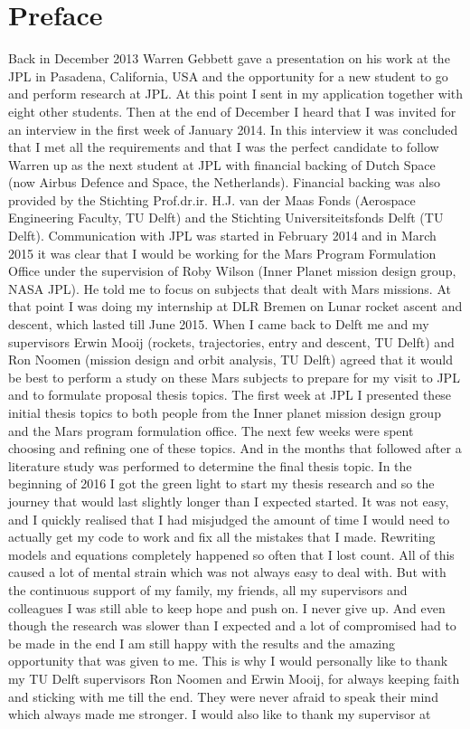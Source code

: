 \chapter*{Preface} 

Back in December 2013 Warren Gebbett gave a presentation on his work at the \ac{JPL} in Pasadena, California, USA and the opportunity for a new student to go and perform research at \ac{JPL}. At this point I sent in my application together with eight other students.  Then at the end of December I heard that I was invited for an interview in the first week of January 2014. In this interview it was concluded that I met all the requirements and that I was the perfect candidate to follow Warren up as the next student at \ac{JPL} with financial backing of Dutch Space (now Airbus Defence and Space, the Netherlands). Financial backing was also provided by the Stichting Prof.dr.ir. H.J. van der Maas Fonds (Aerospace Engineering Faculty, TU Delft) and the Stichting Universiteitsfonds Delft (TU Delft). Communication with \ac{JPL} was started in February 2014 and in March 2015 it was clear that I would be working for the Mars Program Formulation Office under the supervision of Roby Wilson (Inner Planet mission design group, NASA \ac{JPL}). He told me to focus on subjects that dealt with Mars missions. At that point I was doing my internship at DLR Bremen on Lunar rocket ascent and descent, which lasted till June 2015. When I came back to Delft me and my supervisors Erwin Mooij (rockets, trajectories, entry and descent, TU Delft) and Ron Noomen (mission design and orbit analysis, TU Delft) agreed that it would be best to perform a study on these Mars subjects to prepare for my visit to \ac{JPL} and to formulate proposal thesis topics. The first week at \ac{JPL} I presented these initial thesis topics to both people from the Inner planet mission design group and the Mars program formulation office. The next few weeks were spent choosing and refining one of these topics. And in the months that followed after a literature study was performed to determine the final thesis topic. In the beginning of 2016 I got the green light to start my thesis research and so the journey that would last slightly longer than I expected started. It was not easy, and I quickly realised that I had misjudged the amount of time I would need to actually get my code to work and fix all the mistakes that I made. Rewriting models and equations completely happened so often that I lost count. All of this caused a lot of mental strain which was not always easy to deal with. But with the continuous support of my family, my friends, all my supervisors and colleagues I was still able to keep hope and push on. I never give up. And even though the research was slower than I expected and a lot of compromised had to be made in the end I am still happy with the results and the amazing opportunity that was given to me. This is why I would personally like to thank my TU Delft supervisors Ron Noomen and Erwin Mooij, for always keeping faith and sticking with me till the end. They were never afraid to speak their mind which always made me stronger. I would also like to thank my supervisor at 